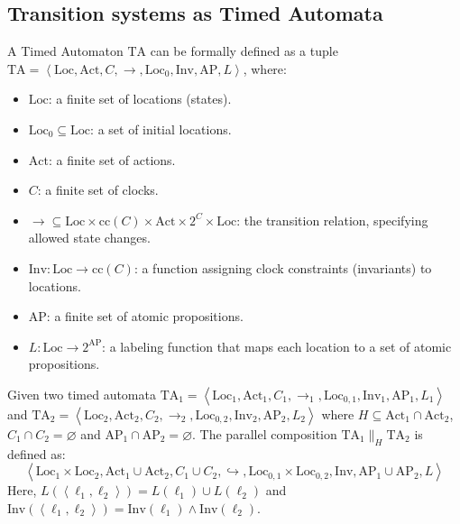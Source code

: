 \subsection{Transition systems as Timed Automata}
\begin{definition}
    A Timed Automaton $\text{TA}$ can be formally defined as a tuple \\ $\text{TA} = \left\langle \text{Loc}, \text{Act}, C, \rightarrow, \text{Loc}_0, \text{Inv}, \text{AP},L\right\rangle$, where:
    \begin{itemize}
        \item $\text{Loc}$: a finite set of locations (states).
        \item $\text{Loc}_0\subseteq\text{Loc}$: a set of initial locations.
        \item $\text{Act}$: a finite set of actions.
        \item $C$: a finite set of clocks.
        \item $\rightarrow\subseteq\text{Loc}\times\text{cc}(C)\times\text{Act}\times 2^C\times\text{Loc}$: the transition relation, specifying allowed state changes.
        \item $\text{Inv}:\text{Loc}\rightarrow\text{cc}(C)$: a function assigning clock constraints (invariants) to locations.
        \item $\text{AP}$: a finite set of atomic propositions.
        \item $L:\text{Loc}\rightarrow 2^{\text{AP}}$: a labeling function that maps each location to a set of atomic propositions.
    \end{itemize}
\end{definition}
Given two timed automata $\text{TA}_1 = \left\langle \text{Loc}_1, \text{Act}_1, C_1, \rightarrow_1, \text{Loc}_{0,1}, \text{Inv}_1, \text{AP}_1,L_1\right\rangle$ and $\text{TA}_2 = \left\langle \text{Loc}_2, \text{Act}_2, C_2, \rightarrow_2, \text{Loc}_{0,2}, \text{Inv}_2, \text{AP}_2,L_2\right\rangle$ where $H\subseteq\text{Act}_1\cap\text{Act}_2$, $C_1\cap C_2=\varnothing$ and $\text{AP}_1\cap\text{AP}_2=\varnothing$. 
The parallel composition $\text{TA}_1\parallel_H\text{TA}_2$ is defined as:
\[\left\langle \text{Loc}_1\times\text{Loc}_2, \text{Act}_1\cup\text{Act}_2, C_1\cup C_2, \hookrightarrow, \text{Loc}_{0,1}\times\text{Loc}_{0,2}, \text{Inv}, \text{AP}_1\cup\text{AP}_2,L\right\rangle\]
Here, $L(\left\langle \ell_1,\ell_2\right\rangle )=L(\ell_1)\cup L(\ell_2)$ and $\text{Inv}(\left\langle \ell_1,\ell_2\right\rangle )=\text{Inv}(\ell_1)\land \text{Inv}(\ell_2)$. 
